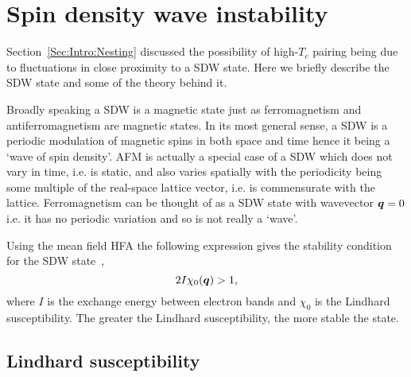 
\section{Spin density wave instability}
\label{Sec:Theo:SpinDensityWave}

Section~\ref{Sec:Intro:Nesting} discussed the possibility of high-$T_c$ pairing being due to fluctuations in close proximity to a \ac{SDW} state. Here we briefly describe the \ac{SDW} state and some of the theory behind it.

Broadly speaking a \ac{SDW} is a magnetic state just as ferromagnetism and antiferromagnetism are magnetic states. In its most general sense, a \ac{SDW} is a periodic modulation of magnetic spins in both space and time hence it being a `wave of spin density'. \ac{AFM} is actually a special case of a \ac{SDW} which does not vary in time, i.e. is static, and also varies spatially with the periodicity being some multiple of the real-space lattice vector, i.e. is commensurate with the lattice. Ferromagnetism can be thought of as a \ac{SDW} state with wavevector $\boldsymbol{q}=0$ i.e. it has no periodic variation and so is not really a `wave'.

Using the mean field \ac{HFA} the following expression gives the stability condition for the \ac{SDW} state~\cite{Moriya1985},
\begin{equation}
2I\chi_0(\boldsymbol{q}) > 1,
\end{equation}
where $I$ is the exchange energy between electron bands and $\chi_0$ is the Lindhard susceptibility. The greater the Lindhard susceptibility, the more stable the state.

\subsection{Lindhard susceptibility}
\label{Sec:Theo:Susceptibility}

